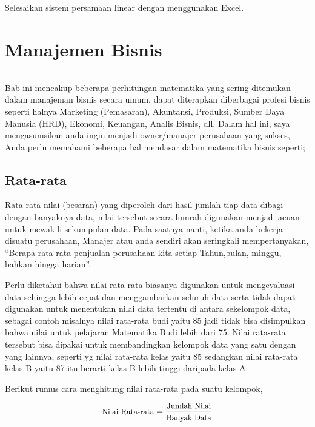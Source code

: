 \documentclass[
]{book}
\begin{document}
Selesaikan sistem persamaan linear dengan menggunakan Excel.

\hypertarget{Manajemen-Bisnis}{%
\chapter{Manajemen Bisnis}\label{Manajemen-Bisnis}}

\begin{center}\rule{0.5\linewidth}{0.5pt}\end{center}

Bab ini mencakup beberapa perhitungan matematika yang sering ditemukan dalam manajeman bisnis secara umum, dapat diterapkan diberbagai profesi bisnis seperti halnya Marketing (Pemasaran), Akuntansi, Produksi, Sumber Daya Manusia (HRD), Ekonomi, Keuangan, Analis Bisnis, dll. Dalam hal ini, saya mengasumsikan anda ingin menjadi owner/manajer perusahaan yang sukses, Anda perlu memahami beberapa hal mendasar dalam matematika bisnis seperti;

\hypertarget{rata-rata}{%
\section{Rata-rata}\label{rata-rata}}

Rata-rata nilai (besaran) yang diperoleh dari hasil jumlah tiap data dibagi dengan banyaknya data, nilai tersebut secara lumrah digunakan menjadi acuan untuk mewakili sekumpulan data. Pada saatnya nanti, ketika anda bekerja disuatu perusahaan, Manajer atau anda sendiri akan seringkali mempertanyakan, ``Berapa rata-rata penjualan perusahaan kita setiap Tahun,bulan, minggu, bahkan hingga harian''.

Perlu diketahui bahwa nilai rata-rata biasanya digunakan untuk mengevaluasi data sehingga lebih cepat dan menggambarkan seluruh data serta tidak dapat digunakan untuk menentukan nilai data tertentu di antara sekelompok data, sebagai contoh misalnya nilai rata-rata budi yaitu 85 jadi tidak bisa disimpulkan bahwa nilai untuk pelajaran Matematika Budi lebih dari 75. Nilai rata-rata tersebut bisa dipakai untuk membandingkan kelompok data yang satu dengan yang lainnya, seperti yg nilai rata-rata kelas yaitu 85 sedangkan nilai rata-rata kelas B yaitu 87 itu berarti kelas B lebih tinggi daripada kelas A.

Berikut rumus cara menghitung nilai rata-rata pada suatu kelompok,

\[ \small{ \text{Nilai Rata-rata}= {\text{Jumlah Nilai} \over \text{Banyak Data}} }\]
\end{document}
